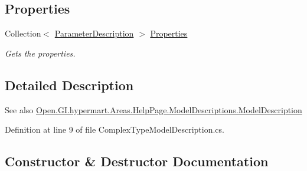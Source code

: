 \subsection*{Properties}
\begin{DoxyCompactItemize}
\item 
Collection$<$ \hyperlink{class_open_1_1_g_i_1_1hypermart_1_1_areas_1_1_help_page_1_1_model_descriptions_1_1_parameter_description}{Parameter\+Description} $>$ \hyperlink{class_open_1_1_g_i_1_1hypermart_1_1_areas_1_1_help_page_1_1_model_descriptions_1_1_complex_type_model_description_aef12ede0391a6d743c2f92b1f94d46c2}{Properties}
\begin{DoxyCompactList}\small\item\em Gets the properties. \end{DoxyCompactList}\end{DoxyCompactItemize}


\subsection{Detailed Description}


\begin{DoxySeeAlso}{See also}
\hyperlink{class_open_1_1_g_i_1_1hypermart_1_1_areas_1_1_help_page_1_1_model_descriptions_1_1_model_description}{Open.\+G\+I.\+hypermart.\+Areas.\+Help\+Page.\+Model\+Descriptions.\+Model\+Description}


\end{DoxySeeAlso}


Definition at line 9 of file Complex\+Type\+Model\+Description.\+cs.



\subsection{Constructor \& Destructor Documentation}
\hypertarget{class_open_1_1_g_i_1_1hypermart_1_1_areas_1_1_help_page_1_1_model_descriptions_1_1_complex_type_model_description_a750b8a599e8e45d091aebfb26edfb3cd}{}
